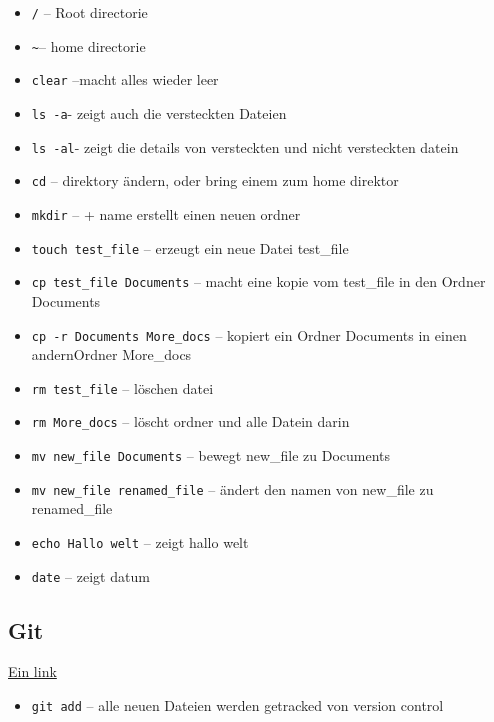 \documentclass[]{article}
\begin{document}
\begin{itemize}
\itemsep1pt\parskip0pt
\item
  \texttt{/} -- Root directorie
\item
  \texttt{\textasciitilde{}}-- home directorie
\item
  \texttt{clear} --macht alles wieder leer
\item
  \texttt{ls -a}- zeigt auch die versteckten Dateien
\item
  \texttt{ls -al}- zeigt die details von versteckten und nicht
  versteckten datein
\item
  \texttt{cd} -- direktory ändern, oder bring einem zum home direktor
\item
  \texttt{mkdir} -- + name erstellt einen neuen ordner
\item
  \texttt{touch test\_file} -- erzeugt ein neue Datei test\_file
\item
  \texttt{cp test\_file Documents} -- macht eine kopie vom test\_file in
  den Ordner Documents
\item
  \texttt{cp -r Documents More\_docs} -- kopiert ein Ordner Documents in
  einen andernOrdner More\_docs
\item
  \texttt{rm test\_file} -- löschen datei
\item
  \texttt{rm More\_docs} -- löscht ordner und alle Datein darin
\item
  \texttt{mv new\_file Documents} -- bewegt new\_file zu Documents
\item
  \texttt{mv new\_file renamed\_file} -- ändert den namen von new\_file
  zu renamed\_file
\item
  \texttt{echo Hallo welt} -- zeigt hallo welt
\item
  \texttt{date} -- zeigt datum
\end{itemize}

\subsection{Git}\label{git}

\href{http://gitready.com/}{Ein link}

\begin{itemize}
\itemsep1pt\parskip0pt
\item
  \texttt{git add} -- alle neuen Dateien werden getracked von version
  control
\end{itemize}
\end{document}
